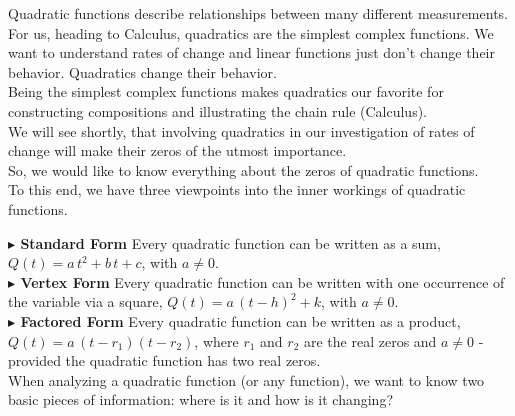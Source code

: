 \documentclass{ximera}
\begin{document}
Quadratic functions describe relationships between many different measurements. \\

For us, heading to Calculus, quadratics are the simplest complex functions.  We want to understand rates of change and linear functions just don't change their behavior. Quadratics change their behavior. \\


Being the simplest complex functions makes quadratics our favorite for constructing compositions and illustrating the chain rule (Calculus). \\

We will see shortly, that involving quadratics in our investigation of rates of change will make their zeros of the utmost importance. \\


So, we would like to know everything about the zeros of quadratic functions. \\



To this end, we have three viewpoints into the inner workings of quadratic functions.



\textbf{\textcolor{red!70!darkgray}{$\blacktriangleright$ Standard Form}} Every quadratic function can be written as a sum, $Q(t) = a \, t^2 + b \, t + c$, with $a \ne 0$. \\



\textbf{\textcolor{red!70!darkgray}{$\blacktriangleright$ Vertex Form}} Every quadratic function can be written with one occurrence of the variable via a square, $Q(t) = a \, (t - h)^2 + k$, with $a \ne 0$. \\



\textbf{\textcolor{red!70!darkgray}{$\blacktriangleright$ Factored Form}} Every quadratic function can be written as a product, $Q(t) = a \, (t - r_1)(t - r_2)$, where $r_1$ and $r_2$ are the real zeros and $a \ne 0$ - provided the quadratic function has two real zeros. \\











When analyzing a quadratic function (or any function), we want to know two basic pieces of information: where is it and how is it changing? 
\end{document}
